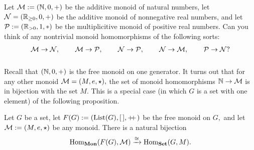 \documentclass[CT4S-EN-RU]{subfiles}
\begin{document}
\begin{exerciseRUS}
\end{exerciseRUS}

\begin{exerciseENG}
Let $\mathcal{M}:=({\mathbb N},0,+)$ be the additive monoid of natural numbers, let $\mathcal{N}=({\mathbb R}_{\geq0},0,+)$ be the additive monoid of nonnegative real numbers, and let $\mathcal{P}:=({\mathbb R}_{>0},1,*)$ be the multiplicitive monoid of positive real numbers. Can you think of any nontrivial monoid homomorphisms of the following sorts: $$\mathcal{M}\rightarrow\mathcal{N},\hspace{.3in}\mathcal{M}\rightarrow\mathcal{P},\hspace{.3in}\mathcal{N}\rightarrow\mathcal{P},\hspace{.3in} \mathcal{N}\rightarrow\mathcal{M},\hspace{.3in}\mathcal{P}\rightarrow\mathcal{N}?$$
\end{exerciseENG}

\begin{exerciseRUS}
\end{exerciseRUS}



\subsubsection{}

\begin{blockENG}
Recall that $({\mathbb N},0,+)$ is the free monoid on one generator. It turns out that for any other monoid $\mathcal{M}=(M,e,\star),$ the set of monoid homomorphisms ${\mathbb N}\rightarrow\mathcal{M}$ is in bijection with the set $M.$ This is a special case (in which $G$ is a set with one element) of the following proposition.
\end{blockENG}

\begin{blockRUS}
\end{blockRUS}

\begin{propositionENG}\label{prop:free monoid}
Let $G$ be a set, let $F(G):=(\textnormal{List}(G),[\,],+\!\!+\hspace{1pt})$ be the free monoid on $G,$ and let $\mathcal{M}:=(M,e,\star)$ be any monoid. There is a natural bijection
$$\textnormal{Hom}_{\mathbf{Mon}}(F(G),\mathcal{M})\xrightarrow{\cong}\textnormal{Hom}_{\mathbf{Set}}(G,M).$$
\end{propositionENG}

\begin{propositionRUS}\label{prop:free monoid}
\end{propositionRUS}
\end{document}
